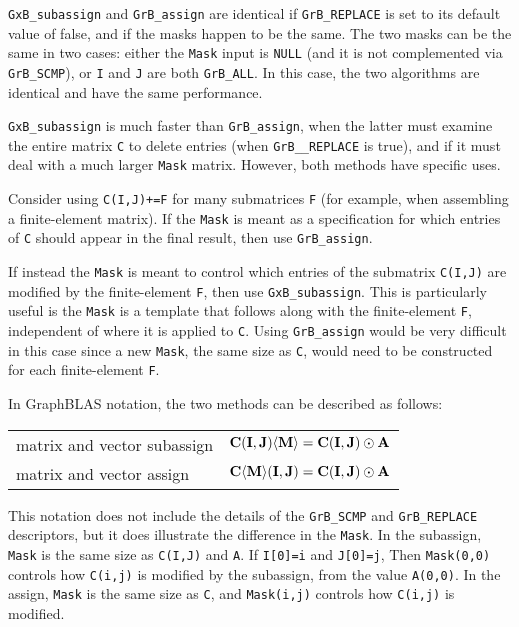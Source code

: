 \documentclass[12pt]{article}
\begin{document}
\newpage
\verb'GxB_subassign' and \verb'GrB_assign' are identical if \verb'GrB_REPLACE'
is set to its default value of false, and if the masks happen to be the same.
The two masks can be the same in two cases:  either the \verb'Mask' input is
\verb'NULL' (and it is not complemented via \verb'GrB_SCMP'), or \verb'I' and
\verb'J' are both \verb'GrB_ALL'.  In this case, the two algorithms are
identical and have the same performance.

\verb'GxB_subassign' is much faster than \verb'GrB_assign', when the latter
must examine the entire matrix \verb'C' to delete entries (when
\verb'GrB__REPLACE' is true), and if it must deal with a much larger
\verb'Mask' matrix.  However, both methods have specific uses.

Consider using \verb'C(I,J)+=F' for many submatrices \verb'F' (for example,
when assembling a finite-element matrix).  If the \verb'Mask' is meant as a
specification for which entries of \verb'C' should appear in the final result,
then use \verb'GrB_assign'.

If instead the \verb'Mask' is meant to control which entries of the submatrix
\verb'C(I,J)' are modified by the finite-element \verb'F', then use
\verb'GxB_subassign'.  This is particularly useful is the \verb'Mask' is a
template that follows along with the finite-element \verb'F', independent of
where it is applied to \verb'C'.  Using \verb'GrB_assign' would be very
difficult in this case since a new \verb'Mask', the same size as \verb'C',
would need to be constructed for each finite-element \verb'F'.

In GraphBLAS notation, the two methods can be described as follows:

\vspace{0.05in}
\begin{tabular}{ll}
\hline
matrix and vector subassign & ${\bf C(I,J) \langle M \rangle}  = {\bf C(I,J)} \odot {\bf A}$ \\
matrix and vector    assign & ${\bf C \langle M \rangle (I,J)} = {\bf C(I,J)} \odot {\bf A}$ \\
\hline
\end{tabular}
\vspace{0.05in}

This notation does not include the details of the \verb'GrB_SCMP' and
\verb'GrB_REPLACE' descriptors, but it does illustrate the difference in the
\verb'Mask'.  In the subassign, \verb'Mask' is the same size as \verb'C(I,J)'
and \verb'A'.  If \verb'I[0]=i' and \verb'J[0]=j', Then \verb'Mask(0,0)'
controls how \verb'C(i,j)' is modified by the subassign, from the value
\verb'A(0,0)'.  In the assign, \verb'Mask' is the same size as \verb'C', and
\verb'Mask(i,j)' controls how \verb'C(i,j)' is modified.
\end{document}
